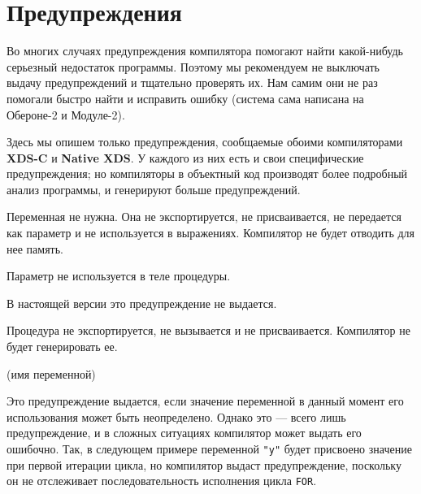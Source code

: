 

\section{Предупреждения}

Во многих случаях предупреждения компилятора помогают найти какой-нибудь
серьезный недостаток программы. Поэтому мы рекомендуем не выключать
выдачу предупреждений и тщательно проверять их. Нам самим они не раз
помогали быстро найти и исправить ошибку
(система \xds{} сама написана на \xds{} Обероне-2 и Модуле-2).

Здесь мы опишем только предупреждения, сообщаемые обоими компиляторами
{\bf XDS-C} и {\bf Native XDS}. У каждого из них есть и свои специфические
предупреждения; но компиляторы в объектный код производят более
подробный анализ программы, и генерируют больше предупреждений.


Переменная не нужна. Она не экспортируется, не присваивается, не
передается как параметр и не используется в выражениях. Компилятор
не будет отводить для нее память.


Параметр не используется в теле процедуры.


В настоящей версии это предупреждение не выдается.


Процедура не экспортируется, не вызывается и не присваивается.
Компилятор не будет генерировать ее.

(имя переменной)

Это предупреждение выдается, если значение переменной в данный момент 
его использования может быть неопределено. Однако это --- всего лишь
предупреждение, и в сложных ситуациях компилятор может выдать его
ошибочно.
Так, в следующем примере переменной \verb'"y"' будет присвоено значение 
при первой итерации цикла, но компилятор выдаст предупреждение, поскольку 
он не отслеживает последовательность исполнения цикла \verb'FOR'.

